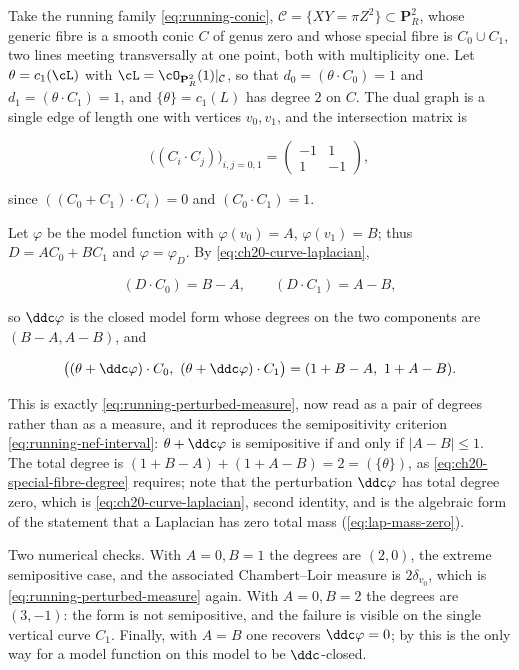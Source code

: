 \begin{example}
\label{ex:ch20-conic-ddc}
Take the running family \eqref{eq:running-conic},
\(\mathcal C=\{XY=\pi Z^2\}\subset\mathbf P^2_R\), whose generic fibre is a
smooth conic \(C\) of genus zero and whose special fibre is
\(C_0\cup C_1\), two lines meeting transversally at one point, both with
multiplicity one.  Let
\(\theta=c_1(\cL)\) with \(\cL=\cO_{\mathbf P^2_R}(1)|_{\mathcal C}\), so
that \(d_0=(\theta\cdot C_0)=1\) and \(d_1=(\theta\cdot C_1)=1\), and
\(\{\theta\}=c_1(L)\) has degree \(2\) on \(C\).  The dual graph is a single
edge of length one with vertices \(v_0,v_1\), and the intersection matrix is

\begin{equation}
\label{eq:ch20-conic-matrix}
 \bigl((C_i\cdot C_j)\bigr)_{i,j=0,1}
 =\begin{pmatrix}-1&1\\1&-1\end{pmatrix},
\end{equation}

since \(((C_0+C_1)\cdot C_i)=0\) and \((C_0\cdot C_1)=1\).

Let \(\varphi\) be the model function with \(\varphi(v_0)=A\),
\(\varphi(v_1)=B\); thus \(D=AC_0+BC_1\) and \(\varphi=\varphi_D\).  By
\eqref{eq:ch20-curve-laplacian},

\[
 (D\cdot C_0)=B-A,
 \qquad
 (D\cdot C_1)=A-B,
\]

so \(\ddc\varphi\) is the closed model form whose degrees on the two
components are \((B-A,A-B)\), and

\begin{equation}
\label{eq:ch20-conic-perturbed-degrees}
 \bigl((\theta+\ddc\varphi)\cdot C_0,\ (\theta+\ddc\varphi)\cdot C_1\bigr)
 =(1+B-A,\ 1+A-B).
\end{equation}

This is exactly \eqref{eq:running-perturbed-measure}, now read as a pair of
degrees rather than as a measure, and it reproduces the semipositivity
criterion \eqref{eq:running-nef-interval}: \(\theta+\ddc\varphi\) is
semipositive if and only if \(|A-B|\leq1\).  The total degree is
\((1+B-A)+(1+A-B)=2=(\{\theta\})\), as
\eqref{eq:ch20-special-fibre-degree} requires; note that the perturbation
\(\ddc\varphi\) has total degree zero, which is
\eqref{eq:ch20-curve-laplacian}, second identity, and is the algebraic form
of the statement that a Laplacian has zero total mass
(\eqref{eq:lap-mass-zero}).

Two numerical checks.  With \(A=0,B=1\) the degrees are \((2,0)\), the
extreme semipositive case, and the associated Chambert--Loir measure is
\(2\delta_{v_0}\), which is \eqref{eq:running-perturbed-measure} again.
With \(A=0,B=2\) the degrees are \((3,-1)\): the form is not semipositive,
and the failure is visible on the single vertical curve \(C_1\).  Finally,
with \(A=B\) one recovers \(\ddc\varphi=0\); by
 this is the only way for a model function on this
model to be \(\ddc\)-closed.
\end{example}

